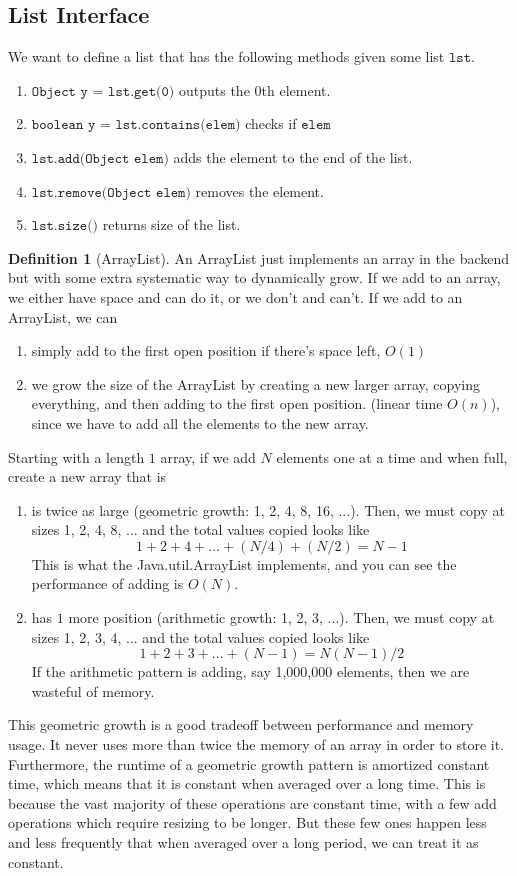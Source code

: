 \documentclass{article}
\theoremstyle{definition}
\theoremstyle{remark}
\theoremstyle{definition}
\newtheorem{definition}{Definition}[section]
\begin{document}
\subsection{List Interface}

We want to define a list that has the following methods given some list $\texttt{lst}$. 
\begin{enumerate}
    \item $\texttt{Object y = lst.get(0)}$ outputs the $0$th element. 
    \item $\texttt{boolean y = lst.contains(elem)}$ checks if $\texttt{elem}$ 
    \item $\texttt{lst.add(Object elem)}$ adds the element to the end of the list. 
    \item $\texttt{lst.remove(Object elem)}$ removes the element. 
    \item $\texttt{lst.size()}$ returns size of the list. 
\end{enumerate}

\begin{definition}[ArrayList]
An ArrayList just implements an array in the backend but with some extra systematic way to dynamically grow. If we add to an array, we either have space and can do it, or we don't and can't. If we add to an ArrayList, we can 
\begin{enumerate}
    \item simply add to the first open position if there's space left, $O(1)$ 
    \item we grow the size of the ArrayList by creating a new larger array, copying everything, and then adding to the first open position. (linear time $O(n)$), since we have to add all the elements to the new array.
\end{enumerate}
Starting with a length $1$ array, if we add $N$ elements one at a time and when full, create a new array that is
\begin{enumerate}
    \item is twice as large (geometric growth: 1, 2, 4, 8, 16, ...). Then, we must copy at sizes 1, 2, 4, 8, ... and the total values copied looks like 
    \[1 + 2 + 4 + \ldots + (N/4) + (N/2) = N - 1\]
    This is what the Java.util.ArrayList implements, and you can see the performance of adding is $O(N)$.
    \item has $1$ more position (arithmetic growth: 1, 2, 3, ...). Then, we must copy at sizes 1, 2, 3, 4, ... and the total values copied looks like
    \[1 + 2 + 3 + \ldots + (N - 1) = N (N - 1)/2\]
    If the arithmetic pattern is adding, say 1,000,000 elements, then we are wasteful of memory. 
\end{enumerate}
This geometric growth is a good tradeoff between performance and memory usage. It never uses more than twice the memory of an array in order to store it. Furthermore, the runtime of a geometric growth pattern is amortized constant time, which means that it is constant when averaged over a long time. This is because the vast majority of these operations are constant time, with a few add operations which require resizing to be longer. But these few ones happen less and less frequently that when averaged over a long period, we can treat it as constant. 
\end{definition}
\end{document}
